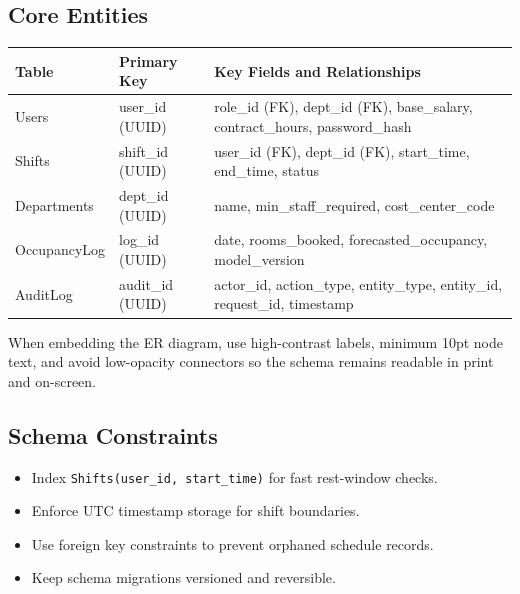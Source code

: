 \documentclass[11pt,a4paper]{article}
\newcommand{\thead}[1]{\textcolor{HeaderText}{\textbf{#1}}}
\begin{document}
\subsection{Core Entities}
\begin{tabularx}{\textwidth}{P{0.22\textwidth}P{0.22\textwidth}Y}
\toprule
{}
\thead{Table} & \thead{Primary Key} & \thead{Key Fields and Relationships} \\
\midrule
Users & user\_id (UUID) & role\_id (FK), dept\_id (FK), base\_salary, contract\_hours, password\_hash \\
Shifts & shift\_id (UUID) & user\_id (FK), dept\_id (FK), start\_time, end\_time, status \\
Departments & dept\_id (UUID) & name, min\_staff\_required, cost\_center\_code \\
OccupancyLog & log\_id (UUID) & date, rooms\_booked, forecasted\_occupancy, model\_version \\
AuditLog & audit\_id (UUID) & actor\_id, action\_type, entity\_type, entity\_id, request\_id, timestamp \\
\bottomrule
\end{tabularx}

\begin{tcolorbox}[colback=SoftBg,colframe=Accent,title=Schema Readability Note]
When embedding the ER diagram, use high-contrast labels, minimum 10pt node text, and avoid low-opacity connectors so the schema remains readable in print and on-screen.
\end{tcolorbox}

\subsection{Schema Constraints}
\begin{itemize}
  \item Index \texttt{Shifts(user\_id, start\_time)} for fast rest-window checks.
  \item Enforce UTC timestamp storage for shift boundaries.
  \item Use foreign key constraints to prevent orphaned schedule records.
  \item Keep schema migrations versioned and reversible.
\end{itemize}
\end{document}
